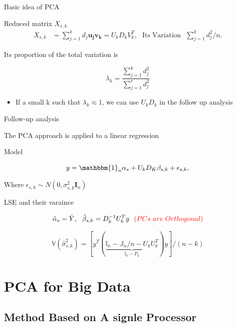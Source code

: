 \documentclass[ignorenonframetext,]{beamer}
\providecommand{\tightlist}{%
  \setlength{\itemsep}{0pt}\setlength{\parskip}{0pt}}
\begin{document}
\begin{frame}{Basic idea of PCA}

\begin{block}{Reduced matrix $X_{s,k}$}
\begin{align*}
  X_{s,k} &= \sum_{j=1}^{k}d_j\pmb{u_jv_k} = U_kD_kV_k^T, \text{~~Its Variation ~}  \sum_{j=1}^kd_j^2/n. 
\end{align*}
\end{block}

Its proportion of the total variation is

\[
\lambda_k = \frac{\sum_{j=1}^{k}d_j^2}{\sum_{j=1}^{r}d_j^2} 
\]

\begin{itemize}
\tightlist
\item
  If a small k such that \(\lambda_k \approx 1\), we can use \(U_kD_k\)
  in the follow up analysis
\end{itemize}

\end{frame}

\begin{frame}{Follow-up analysis}

The PCA approach is applied to a linear regression

\begin{block}{Model}

\[
  y = \mathbbm{1}_{n}\alpha_s + U_kD_K\beta_{s,k} + \epsilon_{s,k},
\]

Where \(\epsilon_{s,k} \sim N(0, \sigma^2_{s,k}\pmb{I}_n)\)

\end{block}

\begin{block}{LSE and their varaince}

\[
  \hat{\alpha}_s = \bar{Y},~~ \hat{\beta}_{s,k} = D_k^{-1}U_k^Ty  ~~\textcolor{red}{(PCs~are~ Orthogonal)}
\]

\[
  \mathbb{V}(\hat{\sigma}_{s,k}^2) = [y^T(\underbrace{\mathbb{I_n} - \mathbb{J}_n/n - U_kU_k^T}_{\mathbb{I_n} - P_k})y]/(n-k)
\]

\end{block}

\end{frame}

\section{PCA for Big Data}\label{pca-for-big-data}

\subsection{Method Based on A signle
Processor}\label{method-based-on-a-signle-processor}
\end{document}
